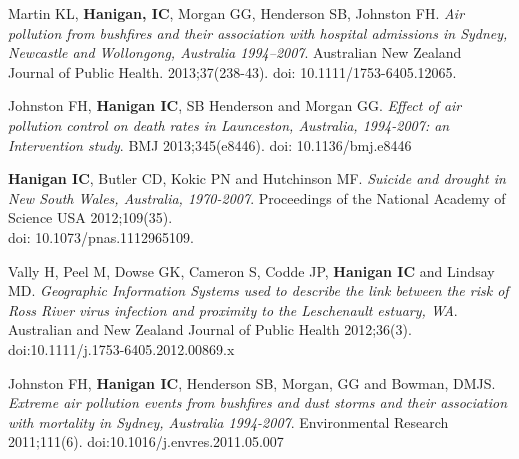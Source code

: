 \documentclass[a4paper,11pt]{article}
\begin{document}
\normalsize

 
\renewcommand{\labelenumi}{\textsc{a}\theenumi.}
\begin{revnumerate}

\item Martin KL, \textbf{Hanigan, IC}, Morgan GG, Henderson SB, Johnston FH. \emph{Air pollution from bushfires and their association with hospital admissions in Sydney, Newcastle and Wollongong, Australia 1994–2007}. Australian New Zealand Journal of Public Health. 2013;37(238-43). doi: 10.1111/1753-6405.12065.


\item Johnston FH, \textbf{Hanigan IC}, SB Henderson and Morgan GG. \emph{Effect of air pollution control on death rates in Launceston, Australia, 1994-2007: an Intervention study}.  BMJ 2013;345(e8446). doi: 10.1136/bmj.e8446

\item \textbf{Hanigan IC}, Butler CD, Kokic PN and Hutchinson MF. \emph{Suicide and drought in New South Wales, Australia, 1970-2007}.  Proceedings of the National Academy of Science USA 2012;109(35).\\
doi: 10.1073/pnas.1112965109.

\item  Vally H, Peel M, Dowse GK, Cameron S, Codde JP, \textbf{Hanigan IC} and Lindsay MD. \emph{Geographic Information Systems used to describe the link between the risk of Ross River virus infection and proximity to the Leschenault estuary, WA}. Australian and New Zealand Journal of Public Health 2012;36(3). doi:10.1111/j.1753-6405.2012.00869.x

\item Johnston FH, \textbf{Hanigan IC}, Henderson SB, Morgan, GG and Bowman, DMJS. \emph{Extreme air pollution events from bushfires and dust storms and their association with mortality in Sydney, Australia 1994-2007}.  Environmental Research 2011;111(6). doi:10.1016/j.envres.2011.05.007


\end{revnumerate}
\end{document}
